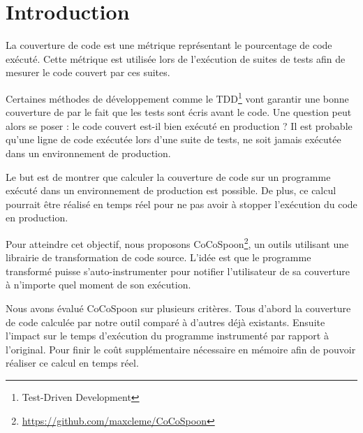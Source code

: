\chapter*{Introduction}
	\thispagestyle{introduction}

La couverture de code est une métrique représentant le pourcentage de code exécuté. Cette métrique est utilisée lors de l'exécution de suites de tests afin de mesurer le code couvert par ces suites. 

Certaines méthodes de développement comme le TDD\footnote{Test-Driven Development} vont garantir une bonne couverture de par le fait que les tests sont écris avant le code. Une question peut alors se poser : le code couvert est-il bien exécuté en production ? Il est probable qu’une ligne de code exécutée lors d’une suite de tests, ne soit jamais exécutée dans un environnement de production. 

Le but est de montrer que calculer la couverture de code sur un programme exécuté dans un environnement de production est possible. De plus, ce calcul pourrait être réalisé en temps réel pour ne pas avoir à stopper l’exécution du code en production.

Pour atteindre cet objectif, nous proposons CoCoSpoon\footnote{\url{https://github.com/maxcleme/CoCoSpoon}}, un outils utilisant une librairie de transformation de code source. L’idée est que le programme transformé puisse s’auto-instrumenter pour notifier l’utilisateur de sa couverture à n'importe quel moment de son exécution.

Nous avons évalué CoCoSpoon sur plusieurs critères. Tous d’abord la couverture de code calculée par notre outil comparé à d’autres déjà existants. Ensuite l’impact sur le temps d’exécution du programme instrumenté par rapport à l’original. Pour finir le coût supplémentaire nécessaire en mémoire afin de pouvoir réaliser ce calcul en temps réel.

